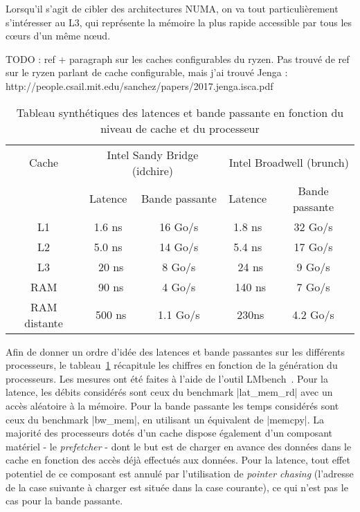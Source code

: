 Lorsqu'il s'agit de cibler des architectures NUMA, on va tout particulièrement s'intéresser au L3, qui représente la mémoire la plus rapide accessible par tous les cœurs d'un même nœud.

\begin{todo}
TODO : ref + paragraph sur les caches configurables du ryzen.
Pas trouvé de ref sur le ryzen parlant de cache configurable, mais j'ai trouvé Jenga : http://people.csail.mit.edu/sanchez/papers/2017.jenga.isca.pdf
\end{todo}

\begin{table}[ht]
\def\arraystretch{1.5}
\centering
\begin{tabular}{|c||c|c|c|c|}\hline
  Cache & \multicolumn{2}{c|}{Intel Sandy Bridge (idchire)} & \multicolumn{2}{c|}{Intel Broadwell (brunch)}  \\ \cline{2-5} 
 & Latence & Bande passante & Latence & Bande passante \\ \hline
 L1 & 1.6 ns & 16 Go/s & 1.8 ns & 32 Go/s \\ \hline
 L2 & 5.0 ns & 14 Go/s & 5.4 ns & 17 Go/s \\ \hline
 L3 & ~20 ns & 8 Go/s & ~24 ns & 9 Go/s \\ \hline
 RAM & ~90 ns & 4 Go/s & ~140 ns & 7 Go/s \\ \hline
 RAM distante & ~500 ns & 1.1 Go/s & ~230ns & 4.2 Go/s \\ \hline
\end{tabular}
\caption{Tableau synthétiques des latences et bande passante en fonction du niveau de cache et du processeur}\label{tab:synthese-processeurs}
\end{table}

Afin de donner un ordre d'idée des latences et bande passantes sur les différents processeurs, le tableau~\ref{tab:synthese-processeurs} récapitule les chiffres en fonction de la génération du processeurs.
Les mesures ont été faites à l'aide de l'outil LMbench~\cite{McVoy1996}. Pour la latence, les débits considérés sont ceux du benchmark |lat_mem_rd| avec un accès aléatoire à la mémoire.
Pour la bande passante les temps considérés sont ceux du benchmark |bw_mem|, en utilisant un équivalent de |memcpy|.
La majorité des processeurs dotés d'un cache dispose également d'un composant matériel - le \emph{prefetcher} - dont le but est de charger en avance des données dans le cache en fonction des accès déjà effectués aux données.
Pour la latence, tout effet potentiel de ce composant est annulé par l'utilisation de \emph{pointer chasing} (l'adresse de la case suivante à charger est située dans la case courante), ce qui n'est pas le cas pour la bande passante.

